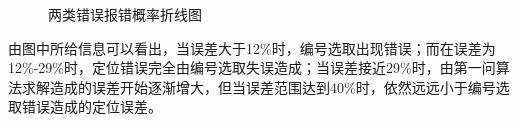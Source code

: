 \documentclass{ctexart}
\begin{document}
\begin{figure}[htbp]
  \center
  
  \hspace{-20pt}%
  \caption{两类错误报错概率折线图}
  \label{两类错误报错概率折线图}
  \end{figure}

  由图中所给信息可以看出，当误差大于12\%时，编号选取出现错误；而在误差为12\%-29\%时，定位错误完全由编号选取失误造成；当误差接近29\%时，由第一问算法求解造成的误差开始逐渐增大，但当误差范围达到40\%时，依然远远小于编号选取错误造成的定位误差。
\end{document}
